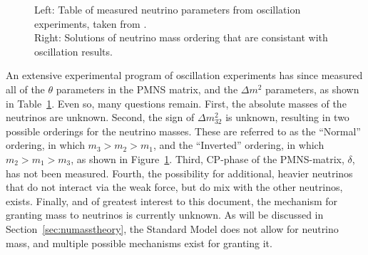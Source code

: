 \documentclass[/main.tex]{subfiles}
\begin{document}
\begin{figure}[t]
  \centering
  \caption[Neutrino Oscillation Parameters and Mass Ordering]{\label{fig:massordering}
    Left: Table of measured neutrino parameters from oscillation experiments, taken from \cite{PDG2018}.\\
    Right: Solutions of neutrino mass ordering that are consistant with oscillation results.
  }
\end{figure}
An extensive experimental program of oscillation experiments has since measured all of the $\theta$ parameters in the PMNS matrix, and the $\Delta m^2$ parameters, as shown in Table~\ref{fig:massordering}.
Even so, many questions remain.
First, the absolute masses of the neutrinos are unknown.
Second, the sign of $\Delta m^2_{32}$ is unknown, resulting in two possible orderings for the neutrino masses.
These are referred to as the ``Normal'' ordering, in which $m_3>m_2>m_1$, and the ``Inverted'' ordering, in which $m_2>m_1>m_3$, as shown in Figure~\ref{fig:massordering}.
Third, CP-phase of the PMNS-matrix, $\delta$, has not been measured.
Fourth, the possibility for additional, heavier neutrinos that do not interact via the weak force, but do mix with the other neutrinos, exists.
Finally, and of greatest interest to this document, the mechanism for granting mass to neutrinos is currently unknown.
As will be discussed in Section~\ref{sec:numasstheory}, the Standard Model does not allow for neutrino mass, and multiple possible mechanisms exist for granting it.
\end{document}
